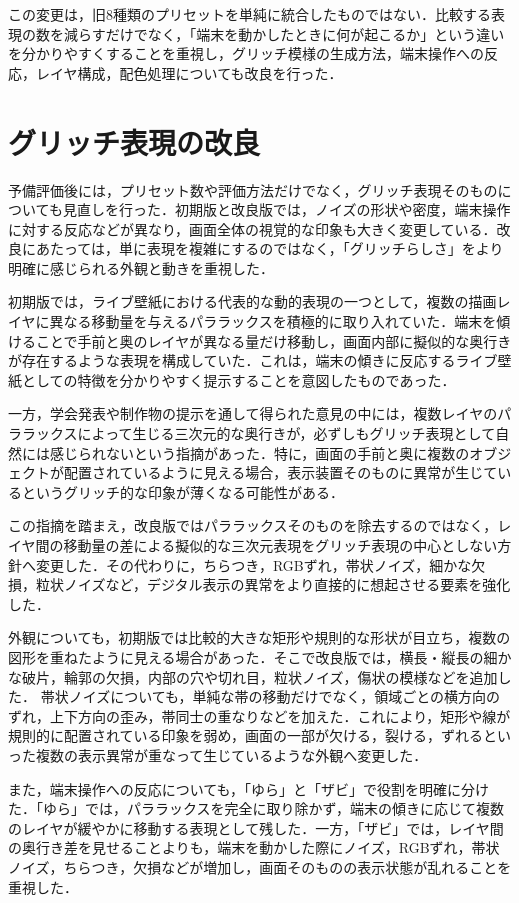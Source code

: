 この変更は，旧8種類のプリセットを単純に統合したものではない．比較する表現の数を減らすだけでなく，「端末を動かしたときに何が起こるか」という違いを分かりやすくすることを重視し，グリッチ模様の生成方法，端末操作への反応，レイヤ構成，配色処理についても改良を行った．

\section{グリッチ表現の改良}

予備評価後には，プリセット数や評価方法だけでなく，グリッチ表現そのものについても見直しを行った．初期版と改良版では，ノイズの形状や密度，端末操作に対する反応などが異なり，画面全体の視覚的な印象も大きく変更している．改良にあたっては，単に表現を複雑にするのではなく，「グリッチらしさ」をより明確に感じられる外観と動きを重視した．

初期版では，ライブ壁紙における代表的な動的表現の一つとして，複数の描画レイヤに異なる移動量を与えるパララックスを積極的に取り入れていた．端末を傾けることで手前と奥のレイヤが異なる量だけ移動し，画面内部に擬似的な奥行きが存在するような表現を構成していた．これは，端末の傾きに反応するライブ壁紙としての特徴を分かりやすく提示することを意図したものであった．

一方，学会発表や制作物の提示を通して得られた意見の中には，複数レイヤのパララックスによって生じる三次元的な奥行きが，必ずしもグリッチ表現として自然には感じられないという指摘があった．特に，画面の手前と奥に複数のオブジェクトが配置されているように見える場合，表示装置そのものに異常が生じているというグリッチ的な印象が薄くなる可能性がある．

この指摘を踏まえ，改良版ではパララックスそのものを除去するのではなく，レイヤ間の移動量の差による擬似的な三次元表現をグリッチ表現の中心としない方針へ変更した．その代わりに，ちらつき，RGBずれ，帯状ノイズ，細かな欠損，粒状ノイズなど，デジタル表示の異常をより直接的に想起させる要素を強化した．

外観についても，初期版では比較的大きな矩形や規則的な形状が目立ち，複数の図形を重ねたように見える場合があった．そこで改良版では，横長・縦長の細かな破片，輪郭の欠損，内部の穴や切れ目，粒状ノイズ，傷状の模様などを追加した．
帯状ノイズについても，単純な帯の移動だけでなく，領域ごとの横方向のずれ，上下方向の歪み，帯同士の重なりなどを加えた．これにより，矩形や線が規則的に配置されている印象を弱め，画面の一部が欠ける，裂ける，ずれるといった複数の表示異常が重なって生じているような外観へ変更した．

また，端末操作への反応についても，「ゆら」と「ザビ」で役割を明確に分けた．「ゆら」では，パララックスを完全に取り除かず，端末の傾きに応じて複数のレイヤが緩やかに移動する表現として残した．一方，「ザビ」では，レイヤ間の奥行き差を見せることよりも，端末を動かした際にノイズ，RGBずれ，帯状ノイズ，ちらつき，欠損などが増加し，画面そのものの表示状態が乱れることを重視した．

